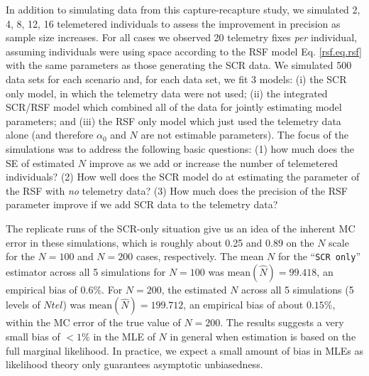 \documentclass[12pt]{article}
\begin{document}
In addition to simulating data from this capture-recapture study, we
simulated 2, 4, 8, 12, 16 telemetered individuals
 to assess the
improvement in precision as sample size increases.  For all cases we
observed 20 telemetry fixes {\it per} individual, assuming individuals
were using space according to the RSF model
Eq. \ref{rsf.eq.rsf} with the same parameters as those generating the
SCR data. We simulated 500 data sets for each scenario and, for each
data set, we fit 3 models: (i) the SCR only model, in which the
telemetry data were not used; (ii) the integrated SCR/RSF model which
combined all of the data  for jointly estimating model parameters; and
(iii) the RSF only model which just used the telemetry data alone (and
therefore $\alpha_{0}$ and $N$ are not  estimable parameters). 
The focus of the simulations was to address the following basic questions:
 (1) how much does
the SE of estimated $N$ improve as we add or increase the number of
telemetered individuals?  (2) How well does the SCR model do at
estimating the parameter of the RSF with {\it no} telemetry data?  (3)
How much does the precision of the RSF parameter improve if we add SCR
data to the telemetry data?



































The replicate runs of the SCR-only situation give us an idea of the
inherent MC error in these simulations, which is roughly about
0.25 and 0.89 on the $N$ scale for the $N=100$ and $N=200$ cases, respectively.
 The mean $N$ for the ``\mbox{\tt SCR only}'' estimator
across all 5 simulations for $N=100$ was $\mbox{mean}(\hat{N}) = 99.418$, an empirical bias of
$0.6\%$. For $N=200$, the estimated $N$ across all 5 simulations (5
levels of $Ntel$)  was
$\mbox{mean}(\hat{N}) = 199.712$, an empirical bias of about $0.15\%$, within the MC error of
the true value of $N=200$.
The results suggests a very small bias of $< 1\%$
in the MLE of $N$ in general when estimation is based on the full
marginal likelihood. 
  In practice, we expect a
small amount of bias in MLEs as likelihood theory only guarantees
asymptotic unbiasedness.
\end{document}
